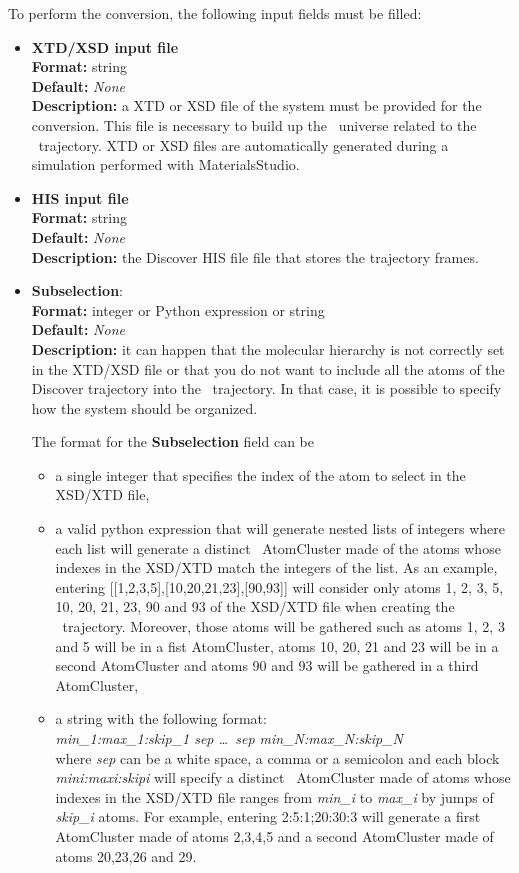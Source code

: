\documentclass[a4paper,11pt]{report}
\begin{document}
To perform the conversion, the following input fields must be filled:
\begin{itemize}
\item \textbf{XTD/XSD input file}\\
\textbf{Format:} string\\
\textbf{Default:} \textit{None}\\
\textbf{Description:} a XTD or XSD file of the system must be provided for the conversion. This file is necessary to build up 
the \MMTK\ universe related to the \MMTK\ trajectory. XTD or XSD files are automatically generated during a simulation performed 
with MaterialsStudio.

\item \textbf{HIS input file}\\
\textbf{Format:} string\\
\textbf{Default:} \textit{None}\\
\textbf{Description:} the Discover HIS file file that stores the trajectory frames.

\item \textbf{Subselection}:\\
\textbf{Format:} integer or Python expression or string\\
\textbf{Default:} \textit{None}\\
\textbf{Description:} it can happen that the molecular hierarchy is not correctly set in the XTD/XSD file or that 
you do not want to include all the atoms of the Discover trajectory into the \MMTK\ trajectory. In that case, 
it is possible to specify how the system should be organized.

The format for the \textbf{Subselection} field can be
\begin{itemize}
\item a single integer that specifies the index of the atom to select in the XSD/XTD file,
\item a valid python expression that will generate nested lists of integers where each list will generate a 
distinct \MMTK\ AtomCluster made of the atoms whose indexes in the XSD/XTD match the integers of the list. As an example, 
entering [[1,2,3,5],[10,20,21,23],[90,93]] will consider only atoms 1, 2, 3, 5, 10, 20, 21, 23, 90 and 93 of the XSD/XTD file when creating the \MMTK\ trajectory. Moreover, those atoms will be gathered 
such as atoms 1, 2, 3 and 5 will be in a fist AtomCluster, atoms 10, 20, 21 and 23 will be in a second AtomCluster and atoms 
90 and 93 will be gathered in a third AtomCluster,
\item a string with the following format:\\
\textit{min\_1:max\_1:skip\_1 sep \ldots\ sep min\_N:max\_N:skip\_N}\\
where \textit{sep} can be a white space, a comma or a semicolon and each block \textit{mini:maxi:skipi} will specify a 
distinct \MMTK\ AtomCluster made of atoms whose indexes in the XSD/XTD file ranges from \textit{min\_i} to \textit{max\_i} 
by jumps of \textit{skip\_i} atoms. For example, entering 2:5:1;20:30:3 will generate a first AtomCluster made of atoms 
2,3,4,5 and a second AtomCluster made of atoms 20,23,26 and 29.
\end{itemize}


\end{itemize}
\end{document}

